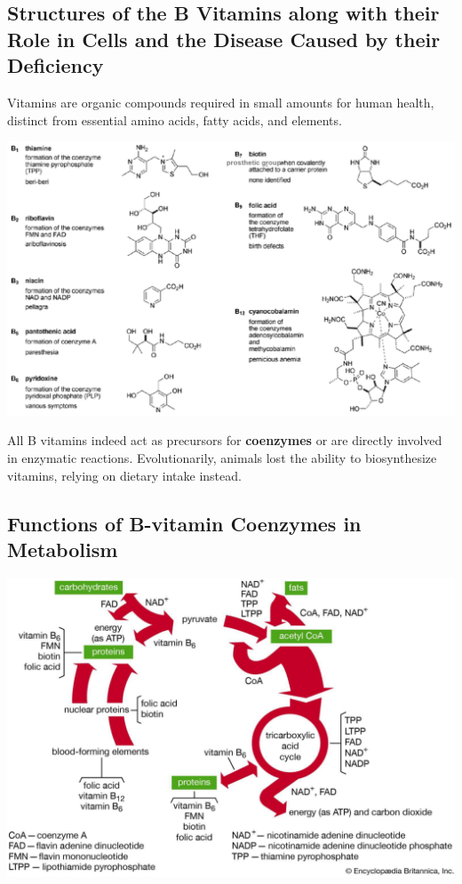 \documentclass[10pt]{article}
\begin{document}
\subsection*{Structures of the B Vitamins along with their Role in Cells and the Disease Caused by their Deficiency}
Vitamins are organic compounds required in small amounts for human health, distinct from essential amino acids, fatty acids, and elements.
\begin{center} 
	\includegraphics*[width=\textwidth]{L1_4.png}
\end{center}
All B vitamins indeed act as precursors for \textbf{coenzymes} or are directly involved in enzymatic reactions.  Evolutionarily, animals lost the ability to biosynthesize vitamins, relying on dietary intake instead.

\subsection*{Functions of B-vitamin Coenzymes in Metabolism}
\begin{center} 
	\includegraphics*[width=\textwidth]{L1_5.png}
\end{center}
\end{document}
